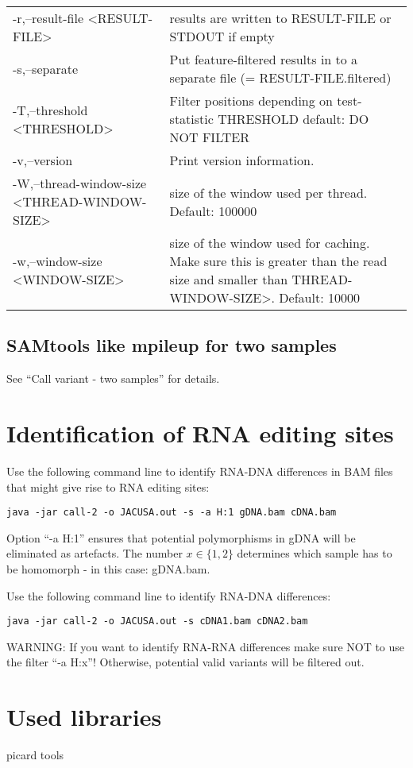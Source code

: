 \documentclass[10pt, a4paper]{article}
\begin{document}
\begin{center}
{\begin{longtable}{p{}p{}}
 -r,--result-file <RESULT-FILE>                 & results are written to RESULT-FILE or STDOUT if empty \\
 -s,--separate                                  & Put feature-filtered results in to a separate file (= RESULT-FILE.filtered)\\
 -T,--threshold <THRESHOLD>                     & Filter positions depending on test-statistic THRESHOLD default: DO NOT FILTER \\
 -v,--version                                   & Print version information. \\
 -W,--thread-window-size <THREAD-WINDOW-SIZE>   & size of the window used per thread. Default: 100000 \\
 -w,--window-size <WINDOW-SIZE>                 & size of the window used for caching. Make sure this is greater than the read size and smaller than THREAD-WINDOW-SIZE>. Default:
 10000
\end{longtable}}
\end{center}
\subsection{SAMtools like mpileup for two samples}
See ``Call variant - two samples'' for details.
\section{Identification of RNA editing sites}
Use the following command line to identify RNA-DNA differences in BAM files that might give rise to RNA editing sites:
\begin{verbatim}
java -jar call-2 -o JACUSA.out -s -a H:1 gDNA.bam cDNA.bam
\end{verbatim}
Option ``-a H:1'' ensures that potential polymorphisms in gDNA will be eliminated as artefacts. The number $x \in \{1, 2\}$
determines which sample has to be homomorph - in this case: gDNA.bam.

Use the following command line to identify RNA-DNA differences:
\begin{verbatim}
java -jar call-2 -o JACUSA.out -s cDNA1.bam cDNA2.bam
\end{verbatim}
WARNING: If you want to identify RNA-RNA differences make sure NOT to use the filter ``-a H:x''! Otherwise, potential valid variants will be filtered out. 

\section{Used libraries}
picard tools
\end{document}
